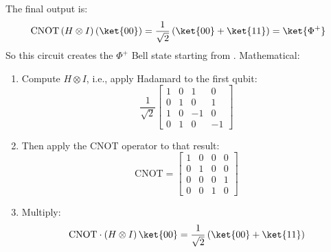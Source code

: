 \noindent
The final output is:
\begin{equation*}
    \text{CNOT}\left(H \otimes I\right)\left(\ket{00}\right) = \dfrac{1}{\sqrt{2}}\left(\ket{00} + \ket{11}\right) = \ket{\Phi^{+}}
\end{equation*}
So this circuit creates the $\Phi^{+}$ Bell state starting from . Mathematical:
\begin{enumerate}
    \item Compute $H \otimes I$, i.e., apply Hadamard to the first qubit:
    \begin{equation*}
        \dfrac{1}{\sqrt{2}} \begin{bmatrix}
            1 & 0 & 1 & 0 \\
            0 & 1 & 0 & 1 \\
            1 & 0 & -1 & 0 \\
            0 & 1 & 0 & -1
        \end{bmatrix}
    \end{equation*}

    \item Then apply the CNOT operator to that result:
    \begin{equation*}
        \text{CNOT} =
        \begin{bmatrix}
            1 & 0 & 0 & 0 \\
            0 & 1 & 0 & 0 \\
            0 & 0 & 0 & 1 \\
            0 & 0 & 1 & 0
        \end{bmatrix}
    \end{equation*}

    \item Multiply:
    \begin{equation*}
        \text{CNOT} \cdot \left(H \otimes I\right) \ket{00} = \dfrac{1}{\sqrt{2}}\left(\ket{00} + \ket{11}\right)
    \end{equation*}
\end{enumerate}

